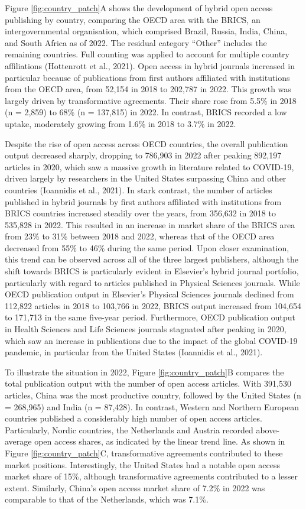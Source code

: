 \documentclass[a4paper,man,floatsintext,longtable,noextraspace,12pt]{apa6}
\begin{document}
Figure \ref{fig:country_patch}A shows the development of hybrid open
access publishing by country, comparing the OECD area with the BRICS, an
intergovernmental organisation, which comprised Brazil, Russia, India,
China, and South Africa as of 2022. The residual category ``Other''
includes the remaining countries. Full counting was applied to account
for multiple country affiliations (Hottenrott et al., 2021). Open access
in hybrid journals increased in particular because of publications from
first authors affiliated with institutions from the OECD area, from
52,154 in 2018 to 202,787 in 2022. This growth was largely driven by
transformative agreements. Their share rose from 5.5\% in 2018 (n =
2,859) to 68\% (n = 137,815) in 2022. In contrast, BRICS recorded a low
uptake, moderately growing from 1.6\% in 2018 to 3.7\% in 2022.

Despite the rise of open access across OECD countries, the overall
publication output decreased sharply, dropping to 786,903 in 2022 after
peaking 892,197 articles in 2020, which saw a massive growth in
literature related to COVID-19, driven largely by researchers in the
United States surpassing China and other countries (Ioannidis et al.,
2021). In stark contrast, the number of articles published in hybrid
journals by first authors affiliated with institutions from BRICS
countries increased steadily over the years, from 356,632 in 2018 to
535,828 in 2022. This resulted in an increase in market share of the
BRICS area from 23\% to 31\% between 2018 and 2022, whereas that of the
OECD area decreased from 55\% to 46\% during the same period. Upon
closer examination, this trend can be observed across all of the three
largest publishers, although the shift towards BRICS is particularly
evident in Elsevier's hybrid journal portfolio, particularly with regard
to articles published in Physical Sciences journals. While OECD
publication output in Elsevier's Physical Sciences journals declined
from 112,822 articles in 2018 to 103,766 in 2022, BRICS output increased
from 104,654 to 171,713 in the same five-year period. Furthermore, OECD
publication output in Health Sciences and Life Sciences journals
stagnated after peaking in 2020, which saw an increase in publications
due to the impact of the global COVID-19 pandemic, in particular from
the United States (Ioannidis et al., 2021).

To illustrate the situation in 2022, Figure \ref{fig:country_patch}B
compares the total publication output with the number of open access
articles. With 391,530 articles, China was the most productive country,
followed by the United States (n = 268,965) and India (n = 87,428). In
contrast, Western and Northern European countries published a
considerably high number of open access articles. Particularly, Nordic
countries, the Netherlands and Austria recorded above-average open
access shares, as indicated by the linear trend line. As shown in Figure
\ref{fig:country_patch}C, transformative agreements contributed to these
market positions. Interestingly, the United States had a notable open
access market share of 15\%, although transformative agreements
contributed to a lesser extent. Similarly, China's open access market
share of 7.2\% in 2022 was comparable to that of the Netherlands, which
was 7.1\%.
\end{document}
